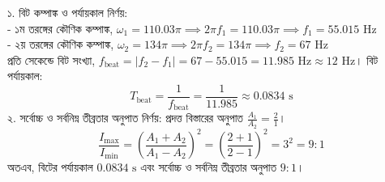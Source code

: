 \documentclass[12pt, a4paper]{article}
\begin{document}
\vspace{1em}

\begin{tcolorbox}[solutionbox={সমাধান (Solution)}]
\noindent
১. বিট কম্পাঙ্ক ও পর্যায়কাল নির্ণয়: \\
- ১ম তরঙ্গের কৌণিক কম্পাঙ্ক, $\omega_1 = 110.03\pi \implies 2\pi f_1 = 110.03\pi \implies f_1 = 55.015\text{ Hz}$ \\
- ২য় তরঙ্গের কৌণিক কম্পাঙ্ক, $\omega_2 = 134\pi \implies 2\pi f_2 = 134\pi \implies f_2 = 67\text{ Hz}$ \\
প্রতি সেকেন্ডে বিট সংখ্যা, $f_{\text{beat}} = |f_2 - f_1| = 67 - 55.015 = 11.985\text{ Hz} \approx 12\text{ Hz}$। বিট পর্যায়কাল:
\[ T_{\text{beat}} = \frac{1}{f_{\text{beat}}} = \frac{1}{11.985} \approx 0.0834\text{ s} \]
২. সর্বোচ্চ ও সর্বনিম্ন তীব্রতার অনুপাত নির্ণয়: প্রদত্ত বিস্তারের অনুপাত $\frac{A_1}{A_2} = \frac{2}{1}$।
\[ \frac{I_{\max}}{I_{\min}} = \left(\frac{A_1 + A_2}{A_1 - A_2}\right)^2 = \left(\frac{2 + 1}{2 - 1}\right)^2 = 3^2 = 9:1 \]
অতএব, বিটের পর্যায়কাল $0.0834\text{ s}$ এবং সর্বোচ্চ ও সর্বনিম্ন তীব্রতার অনুপাত $9:1$।
\end{tcolorbox}

\vspace{1.5em}
\end{document}

